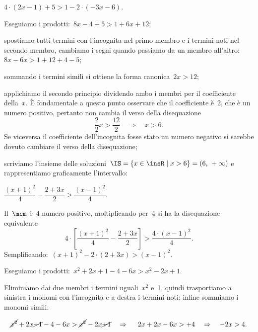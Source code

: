 \begin{exrig}
 \begin{esempio}
$4\cdot (2x-1)+5>1-2\cdot (-3x-6)$.

\begin{enumeratea}
\item Eseguiamo i prodotti:~$8x-4+5>1+6x+12$;

\item spostiamo tutti termini con
l'incognita nel primo membro e i termini noti nel
secondo membro, cambiamo i segni quando passiamo da un membro
all'altro:~$8x-6x>1+12+4-5$;

\item sommando i termini simili si ottiene la forma
canonica~$2x>12$;

\item applichiamo il secondo principio dividendo ambo i
membri per il coefficiente della~$x$. È fondamentale a
questo punto osservare che il coefficiente è~2, che è un numero
positivo, pertanto non cambia il verso della disequazione
\[\frac{2}{2}x>\frac{12}{2}\quad\Rightarrow\quad x>6.\]
Se viceversa il
coefficiente dell'incognita fosse stato un numero
negativo si sarebbe dovuto cambiare il verso della disequazione;

\item scriviamo l'insieme delle
soluzioni~$\IS=\{x\in\insR\mid x>6\}=(6\text{,~}+\infty )$ e rappresentiamo
graficamente l'intervallo:
\begin{center}
 
\end{center}
\end{enumeratea}
 \end{esempio}

 \begin{esempio}
 $\dfrac{(x+1)^{2}}{4}-\dfrac{2+3x}{2}>\dfrac{(x-1)^{2}}{4}.$
\end{esempio}
Il~$\mcm$ è~4 numero positivo, moltiplicando per~4 si ha la disequazione equivalente
\[4\cdot\left[\frac{(x+1)^{2}}{4}-\frac{2+3x}{2}\right]>\frac{4\cdot{(x-1)^{2}}}{4}.\]
Semplificando:~$(x+1)^{2}-2\cdot (2+3x)>(x-1)^{2}$.

Eseguiamo i prodotti:~$x^{2}+2x+1-4-6x>x^{2}-2x+1$.

Eliminiamo dai due membri i termini uguali~$x^{2}$ e~1,
quindi trasportiamo a sinistra i monomi con l'incognita e a
destra i termini noti; infine sommiamo i monomi simili:

\[\cancel{{x^{2}}}+2x\cancel{+1}-4-6x>\cancel{{x^{2}}}-2x\cancel{+1}\quad \Rightarrow\quad~2x+2x-6x>+4
\quad\Rightarrow\quad -2x>4.\]


\end{exrig}
